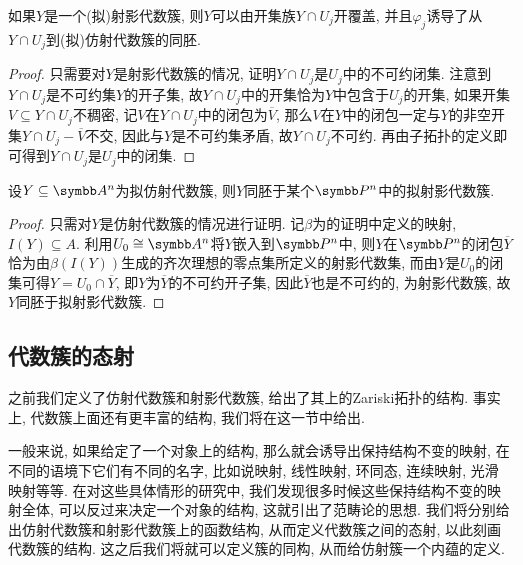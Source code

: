 \begin{proposition}\label{prop:projvarietyopencoverhomeo}
    如果$Y$是一个(拟)射影代数簇, 则$Y$可以由开集族$Y\cap U_j$开覆盖, 并且$\varphi_j$诱导了从$Y\cap U_j$到(拟)仿射代数簇的同胚.
\end{proposition}

\begin{proof}
    只需要对$Y$是射影代数簇的情况, 证明$Y\cap U_j$是$U_j$中的不可约闭集. 注意到$Y\cap U_j$是不可约集$Y$的开子集, 故$Y\cap U_j$中的开集恰为$Y$中包含于$U_j$的开集\parencite[89, Lemma 16.2]{munkres_topology_2000}, 如果开集$V\subseteq Y\cap U_j$不稠密, 记$V$在$Y\cap U_j$中的闭包为$\overline{V}$, 那么$V$在$Y$中的闭包一定与$Y$的非空开集$Y\cap U_j-\overline{V}$不交\parencite[95, Theorem 17.5]{munkres_topology_2000}, 因此与$Y$是不可约集矛盾, 故$Y\cap U_j$不可约. 再由子拓扑的定义即可得到$Y\cap U_j$是$U_j$中的闭集.
\end{proof}

\begin{proposition}
    设$Y\subseteq \AF^n$为拟仿射代数簇, 则$Y$同胚于某个$\PP^n$中的拟射影代数簇.
\end{proposition}

\begin{proof}
    只需对$Y$是仿射代数簇的情况进行证明. 记$\beta$为的证明中定义的映射, $I(Y)\subseteq A$. 利用$U_0\cong\AF^n$将$Y$嵌入到$\PP^n$中, 则$Y$在$\PP^n$的闭包$\overline{Y}$恰为由$\beta (I(Y))$生成的齐次理想的零点集所定义的射影代数集, 而由$Y$是$U_0$的闭集可得$Y=U_0\cap \overline{Y}$, 即$Y$为$\overline{Y}$的不可约开子集, 因此$\overline{Y}$也是不可约的, 为射影代数簇, 故$Y$同胚于拟射影代数簇.
\end{proof}

\subsection{代数簇的态射}

之前我们定义了仿射代数簇和射影代数簇, 给出了其上的Zariski拓扑的结构. 事实上, 代数簇上面还有更丰富的结构, 我们将在这一节中给出.

一般来说, 如果给定了一个对象上的结构, 那么就会诱导出保持结构不变的映射, 在不同的语境下它们有不同的名字, 比如说映射, 线性映射, 环同态, 连续映射, 光滑映射等等. 在对这些具体情形的研究中, 我们发现很多时候这些保持结构不变的映射全体, 可以反过来决定一个对象的结构, 这就引出了范畴论的思想. 我们将分别给出仿射代数簇和射影代数簇上的函数结构, 从而定义代数簇之间的态射, 以此刻画代数簇的结构. 这之后我们将就可以定义簇的同构, 从而给仿射簇一个内蕴的定义.

